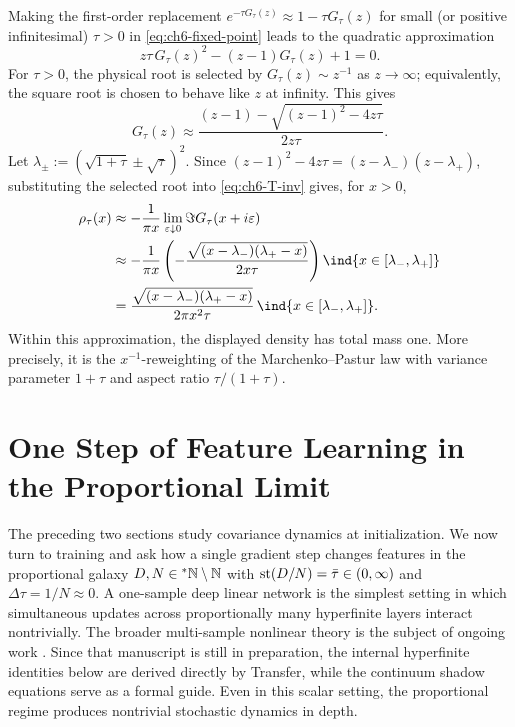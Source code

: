 Making the first-order replacement $e^{-\tau G_\tau(z)} \approx 1 - \tau G_\tau(z)$ for small (or positive infinitesimal) $\tau > 0$ in \eqref{eq:ch6-fixed-point} leads to the quadratic approximation \cite[Section 4.2]{li2026geometric}
\begin{equation}
\label{eq:ch6-small-tau-quad}
z\tau\,G_\tau(z)^2 - (z - 1) G_\tau(z) + 1 = 0.
\end{equation}
For $\tau > 0$, the physical root is selected by $G_\tau(z) \sim z^{-1}$ as $z \to \infty$; equivalently, the square root is chosen to behave like $z$ at infinity. This gives
\begin{equation}
\label{eq:ch6-small-tau-root}
G_\tau(z) \approx \frac{(z - 1) - \sqrt{(z - 1)^2 - 4 z \tau}}{2 z \tau}.
\end{equation}
Let $\lambda_\pm := (\sqrt{1 + \tau} \pm \sqrt{\tau})^2$. Since $(z - 1)^2 - 4 z \tau = (z - \lambda_-)(z - \lambda_+)$, substituting the selected root into \eqref{eq:ch6-T-inv} gives, for $x > 0$,
\begin{equation}
\label{eq:ch6-small-tau-density}
\begin{aligned}
\rho_\tau(x) &\approx -\frac{1}{\pi x}\lim_{\varepsilon \downarrow 0} \Im G_\tau(x + i\varepsilon) \\
&\approx -\frac{1}{\pi x}\left(-\frac{\sqrt{(x - \lambda_-)(\lambda_+ - x)}}{2 x \tau}\right)\ind{x \in [\lambda_-, \lambda_+]} \\
&= \frac{\sqrt{(x - \lambda_-)(\lambda_+ - x)}}{2\pi x^2 \tau}\,\ind{x \in [\lambda_-, \lambda_+]}.
\end{aligned}
\end{equation}
Within this approximation, the displayed density has total mass one. More precisely, it is the $x^{-1}$-reweighting of the Marchenko--Pastur law with variance parameter $1 + \tau$ and aspect ratio $\tau / (1 + \tau)$.

\section{One Step of Feature Learning in the Proportional Limit}
\label{sec:one-step-feature-learning}

The preceding two sections study covariance dynamics at initialization. We now turn to training and ask how a single gradient step changes features in the proportional galaxy $D, N \in {}^*\mathbb{N} \setminus \mathbb{N}$ with $\operatorname{st}(D/N) = \bar{\tau} \in (0, \infty)$ and $\Delta\tau = 1/N \approx 0$. A one-sample deep linear network is the simplest setting in which simultaneous updates across proportionally many hyperfinite layers interact nontrivially. The broader multi-sample nonlinear theory is the subject of ongoing work \cite{li2026feature}. Since that manuscript is still in preparation, the internal hyperfinite identities below are derived directly by Transfer, while the continuum shadow equations serve as a formal guide. Even in this scalar setting, the proportional regime produces nontrivial stochastic dynamics in depth.

